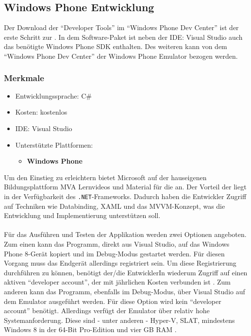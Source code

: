 \documentclass[../Bachelorarbeit.tex]{subfiles}
\begin{document}
\subsection*{Windows Phone Entwicklung}
\label{sub:wp_entwicklung}

Der Download der "`Developer Tools"' im "`Windows Phone Dev Center"' ist der erste Schritt zur .
In dem Software-Paket ist neben der \ac{IDE}: Visual Studio auch das benötigte Windows Phone \ac{SDK} enthalten.
Des weiteren kann von dem "`Windows Phone Dev Center"' der Windows Phone Emulator bezogen werden.


\subsubsection*{Merkmale}
\begin{itemize}
\item Entwicklungssprache: C\#
\item Kosten:  kostenlos
\item \ac{IDE}: Visual Studio
\item Unterstützte Plattformen: 
\begin{itemize}
\item \textbf{Windows Phone}
\end{itemize}
\end{itemize}




Um den Einstieg zu erleichtern bietet Microsoft auf der hauseigenen Bildungsplattform \ac{MVA} Lernvideos und Material für die  an.
Der Vorteil der  liegt in der Verfügbarkeit des \texttt{.NET}-Frameworks.
Dadurch haben die Entwickler Zugriff auf Techniken wie Databinding, \ac{XAML} und das \ac{MVVM}-Konzept, was die Entwicklung und Implementierung unterstützen soll.\\
\\
Für das Ausführen und Testen der Applikation werden zwei Optionen angeboten.
Zum einen kann das Programm, direkt aus Visual Studio, auf das Windows Phone 8-Gerät kopiert und im Debug-Modus gestartet werden. 
Für diesen Vorgang muss das Endgerät allerdings registriert sein. 
Um diese Registrierung durchführen zu können, benötigt der/die EntwicklerIn wiederum Zugriff auf einen aktiven "`developer account"', der mit jährlichen Kosten verbunden ist \parencite[vgl.][]{wp8_account-kosten}.
Zum anderen kann das Programm, ebenfalls im Debug-Modus, über Visual Studio auf dem Emulator ausgeführt werden. 
Für diese Option wird kein "`developer account"' benötigt.
Allerdings verfügt der Emulator über relativ hohe Systemanforderung.
Diese sind - unter anderen - Hyper-V, \ac{SLAT}, mindestens Windows 8 in der 64-Bit Pro-Edition und vier \ac{GB} \ac{RAM} \parencite[vgl.][]{wp8_emulator_requirement}.
 
\end{document}
